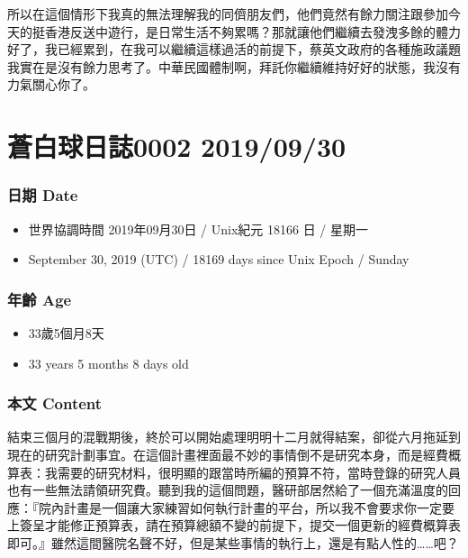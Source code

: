 \documentclass[
]{article}
\providecommand{\tightlist}{%
  \setlength{\itemsep}{0pt}\setlength{\parskip}{0pt}}
\begin{document}
所以在這個情形下我真的無法理解我的同儕朋友們，他們竟然有餘力關注跟參加今天的挺香港反送中遊行，是日常生活不夠累嗎？那就讓他們繼續去發洩多餘的體力好了，我已經累到，在我可以繼續這樣過活的前提下，蔡英文政府的各種施政議題我實在是沒有餘力思考了。中華民國體制啊，拜託你繼續維持好好的狀態，我沒有力氣關心你了。

\hypertarget{ux84bcux767dux7403ux65e5ux8a8c0002-20190930}{%
\section{蒼白球日誌0002
2019/09/30}\label{ux84bcux767dux7403ux65e5ux8a8c0002-20190930}}

\hypertarget{ux65e5ux671f-date-1}{%
\subsubsection{日期 Date}\label{ux65e5ux671f-date-1}}

\begin{itemize}
\tightlist
\item
  世界協調時間 2019年09月30日 / Unix紀元 18166 日 / 星期一
\item
  September 30, 2019 (UTC) / 18169 days since Unix Epoch / Sunday
\end{itemize}

\hypertarget{ux5e74ux9f61-age-1}{%
\subsubsection{年齡 Age}\label{ux5e74ux9f61-age-1}}

\begin{itemize}
\tightlist
\item
  33歲5個月8天
\item
  33 years 5 months 8 days old
\end{itemize}

\hypertarget{ux672cux6587-content-1}{%
\subsubsection{本文 Content}\label{ux672cux6587-content-1}}

結束三個月的混戰期後，終於可以開始處理明明十二月就得結案，卻從六月拖延到現在的研究計劃事宜。在這個計畫裡面最不妙的事情倒不是研究本身，而是經費概算表：我需要的研究材料，很明顯的跟當時所編的預算不符，當時登錄的研究人員也有一些無法請領研究費。聽到我的這個問題，醫研部居然給了一個充滿溫度的回應：『院內計畫是一個讓大家練習如何執行計畫的平台，所以我不會要求你一定要上簽呈才能修正預算表，請在預算總額不變的前提下，提交一個更新的經費概算表即可。』雖然這間醫院名聲不好，但是某些事情的執行上，還是有點人性的\ldots\ldots 吧？
\end{document}
